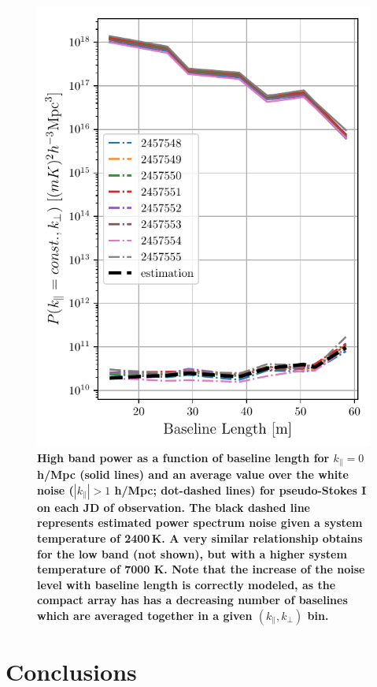 \documentclass[twocolumn, trackchanges]{aastex61}
\newcommand{\edited}[1]{{\bf \color{blue} #1}}
\begin{document}
{\begin{figure}
\centering
\includegraphics[width=0.9\columnwidth]{noise_estimation.pdf}
\caption{\edited{High band power as a function of baseline length for $k_{\parallel}=0$ h/Mpc (solid lines) and an average value over the white noise ($|k_{\parallel}|>1$ h/Mpc; dot-dashed lines) for pseudo-Stokes I on each JD of observation. The black dashed line represents estimated power spectrum noise given a system temperature of 2400\,K.  A very similar relationship obtains for the low band (not shown), but with a higher system temperature of 7000 K.  Note that the increase of the noise level with baseline length is correctly modeled, as the compact array has has a decreasing number of baselines which are averaged together in a given $(k_{\parallel},k_{\perp})$ bin.}}
\label{fig:highband_cuts_per_day}
\end{figure}

\edited{\section{Conclusions}}
\label{conc}

}
\end{document}
